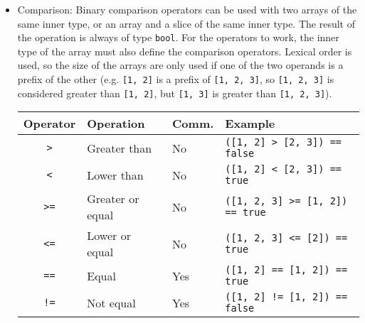 \begin{itemize}
  The operator can also be used when one of the operands is a slice. In this
  case, the return value of the operation will be a slice instead of an array,
  since its size cannot be known at compile time. This operation is actually
  performed more by the slice operand than by the array operands, and is
  discussed further in the section~\ref{sec:slices}.

  The operator \texttt{\~} was chosen to avoid confusion with \texttt{+}, which
  would behave differently depending on the operands.Concatenation is not really
  an arithmetic operation, as \texttt{+} would refer to an addition of all the
  inner values of two arrays, rather than their concatenation. Concatenation
  operator is obviously not commutative.

  \begin{lstlisting}[style=coloredverbatim]
let a : [i32 ; 3] = [1, 2, 3];
let b : [i32 ; 2] = [4, 5];

let c : [i32 ; 5] = a ~ b;

assert (c == [1, 2, 3, 4, 5]);
  \end{lstlisting}

\item Comparison: Binary comparison operators can be used with two arrays of the
  same inner type, or an array and a slice of the same inner type. The result of
  the operation is always of type \texttt{bool}. For the operators to work, the
  inner type of the array must also define the comparison operators. Lexical
  order is used, so the size of the arrays are only used if one of the two operands
  is a prefix of the other (e.g. \texttt{[1, 2]} is a prefix of \texttt{[1, 2,
      3]}, so \texttt{[1, 2, 3]} is considered greater than \texttt{[1, 2]}, but
  \texttt{[1, 3]} is greater than \texttt{[1, 2, 3]}).

  \begin{center}\begin{adjustbox}{max width=1.0\linewidth}
    \begin{tabular}{|c|lll|}
      \hline
      Operator & Operation & Comm. & Example\\
      \hline
      \hline
      \texttt{>}      & Greater than     & No          & \texttt{([1, 2] > [2, 3]) == false}    \\
      \texttt{<}      & Lower than       & No          & \texttt{([1, 2] < [2, 3]) == true}     \\
      \texttt{>=}     & Greater or equal & No          & \texttt{([1, 2, 3] >= [1, 2]) == true} \\
      \texttt{<=}     & Lower or equal   & No          & \texttt{([1, 2, 3] <= [2]) == true}    \\
      \texttt{==}     & Equal            & Yes         & \texttt{([1, 2] == [1, 2]) == true}    \\
      \texttt{!=}     & Not equal        & Yes         & \texttt{([1, 2] != [1, 2]) == false}   \\
      \hline
    \end{tabular}
  \end{adjustbox}\end{center}


\end{itemize}
